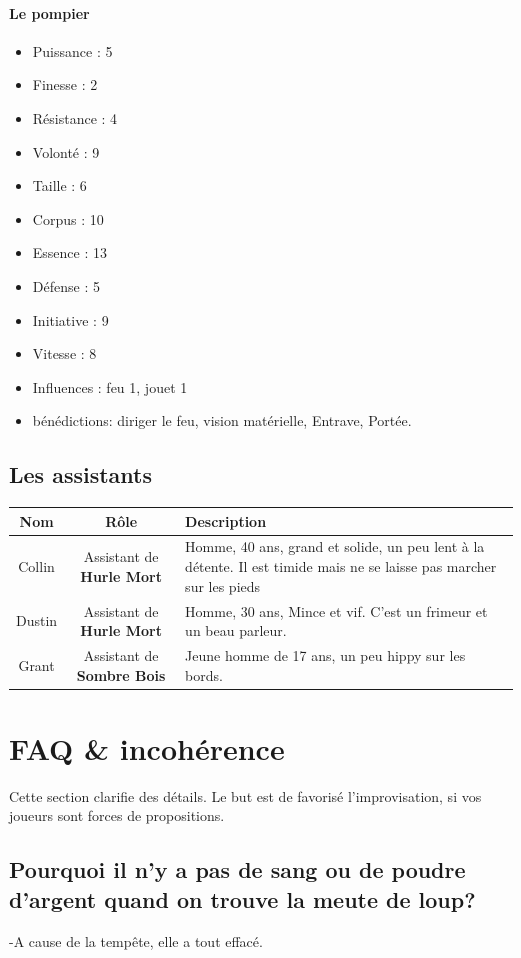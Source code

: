 \documentclass[oneside,12pt]{book}
\newcommand{\Peter}{\textbf{Hurle Mort} }
\newcommand{\Leonard}{\textbf{Sombre Bois} }
\begin{document}
\begin{flushleft}
\paragraph{Le pompier}
\begin{itemize}
\item Puissance : 5
\item Finesse : 2
\item Résistance : 4
\item Volonté : 9
\item Taille : 6
\item Corpus : 10
\item Essence : 13
\item Défense : 5
\item Initiative : 9
\item Vitesse : 8
\item Influences : feu 1, jouet 1
\item bénédictions: diriger le feu, vision matérielle, Entrave, Portée.
\end{itemize}

\subsection{Les assistants}
\begin{tabularx}{\linewidth}{|c|c|X|}
\hline
Nom & Rôle & Description \\
\hline
Collin & Assistant de \Peter & Homme, 40 ans, grand et solide, un peu lent à la détente. Il est timide mais ne se laisse pas marcher sur les pieds\\
\hline
Dustin & Assistant de \Peter & Homme, 30 ans, Mince et vif. C'est un frimeur et un beau parleur.\\
\hline
Grant & Assistant de \Leonard & Jeune homme de 17 ans, un peu hippy sur les bords.  \\
\hline
\end{tabularx}

\clearpage

\section{FAQ \& incohérence}
Cette section clarifie des détails. Le but est de favorisé l'improvisation, si vos joueurs sont forces de propositions.
\subsection{Pourquoi il n'y a pas de sang ou de poudre d'argent quand on trouve la meute de loup?}
-A cause de la tempête, elle a tout effacé. 

\end{flushleft}
\end{document}
